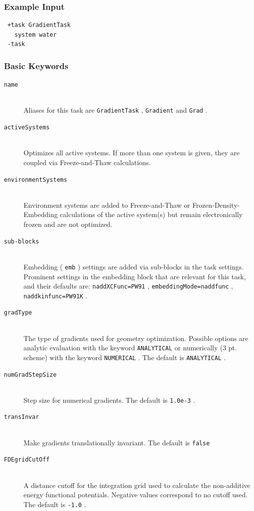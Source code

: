 \documentclass[bibliography=totocnumbered,a4paper,10pt,oneside]{scrbook}
\newcommand{\ttt}[1]{%
  \begingroup\setlength{\fboxsep}{1pt}%
  \colorbox{serenity-green!30}{\texttt{\hspace*{2pt}\vphantom{(g}#1\hspace*{2pt}}}%
  \endgroup
}
\begin{document}
\subsubsection{Example Input}
\begin{lstlisting}
 +task GradientTask
   system water
 -task
\end{lstlisting}
\subsubsection{Basic Keywords}
\begin{description}
\item [\texttt{name}]\hfill \\
 Aliases for this task are \ttt{GradientTask} , \ttt{Gradient} and \ttt{Grad}.
\item [\texttt{activeSystems}]\hfill \\
 Optimizes all active systems. If more than one system is given, they are coupled via Freeze-and-Thaw calculations.
\item [\texttt{environmentSystems}]\hfill \\
 Environment systems are added to Freeze-and-Thaw or Frozen-Density-Embedding calculations of the active system(s) but remain electronically frozen and are not optimized.
\item [\texttt{sub-blocks}]\hfill \\
 Embedding (\ttt{emb}) settings are added via sub-blocks in the task settings.
 Prominent settings in the embedding block that are relevant for this task, and their defaults are:
 \ttt{naddXCFunc=PW91}, \ttt{embeddingMode=naddfunc}, \ttt{naddkinfunc=PW91K}.
\item [\texttt{gradType}]\hfill \\
 The type of gradients used for geometry optimization. Possible options are analytic evaluation with the keyword \ttt{ANALYTICAL} or numerically (3 pt. scheme) with the keyword \ttt{NUMERICAL}. The default is \ttt{ANALYTICAL}.
\item [\texttt{numGradStepSize}]\hfill \\
 Step size for numerical gradients. The default is \ttt{1.0e-3}. 
\item [\texttt{transInvar}]\hfill \\
  Make gradients translationally invariant. The default is \ttt{false}
\item [\texttt{FDEgridCutOff}]\hfill \\
  A distance cutoff for the integration grid used to calculate the non-additive energy functional potentials. Negative values correspond to no cutoff used. The default is \ttt{-1.0}.

\end{description}
\end{document}

